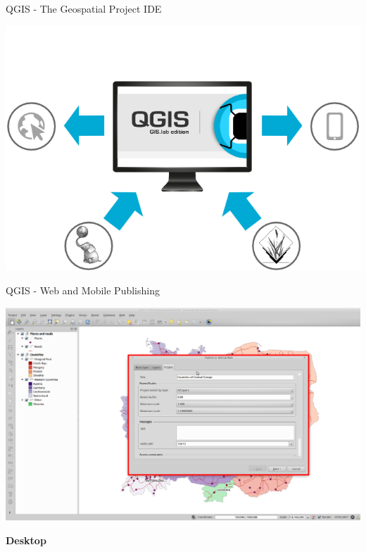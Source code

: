 \documentclass[12pt]{beamer}
\begin{document}
\begin{frame}[plain]{QGIS - The Geospatial Project IDE}
	\begin{center}
		\includegraphics[keepaspectratio=true,width=\textwidth]{images/gislab-client-interfaces.png}
	\end{center}
\end{frame}

\begin{frame}[plain]{QGIS - Web and Mobile Publishing}
	\begin{center}
		\includegraphics[keepaspectratio=true,width=\textwidth]{images/gislab-publish.png}
	\end{center}
\end{frame}


\begin{frame}
	\begin{center}
		\LARGE\textbf{Desktop}	
	\end{center}
\end{frame}
\end{document}
